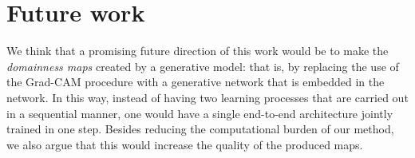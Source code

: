 \documentclass[../main.tex]{subfiles}
\begin{document}
    \section{Future work}
    We think that a promising future direction of this work would be to make the \textit{domainness maps}
    created by a generative model: that is, by replacing the use of the Grad-CAM procedure with a generative
    network that is embedded in the network. In this way, instead of having two learning processes that are
    carried out in a sequential manner, one would have a single end-to-end architecture jointly trained in one
    step. Besides reducing the computational burden of our method, we also argue that this would increase the
    quality of the produced maps.
\end{document}
